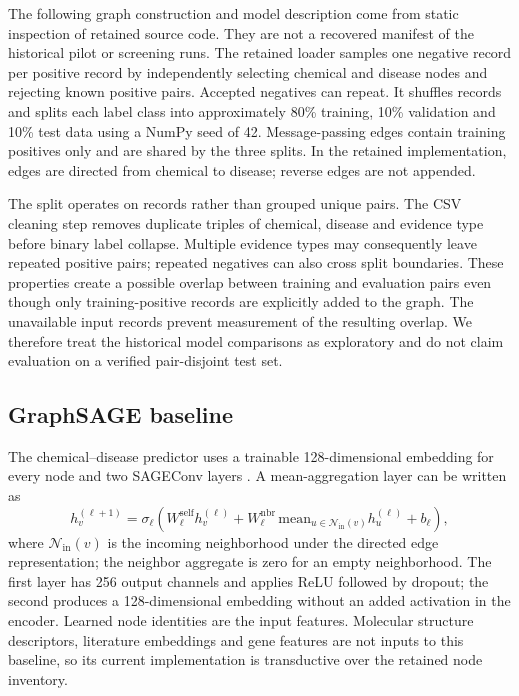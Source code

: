 The following graph construction and model description come from static inspection of retained source code. They are not a recovered manifest of the historical pilot or screening runs. The retained loader samples one negative record per positive record by independently selecting chemical and disease nodes and rejecting known positive pairs. Accepted negatives can repeat. It shuffles records and splits each label class into approximately 80\% training, 10\% validation and 10\% test data using a NumPy seed of 42. Message-passing edges contain training positives only and are shared by the three splits. In the retained implementation, edges are directed from chemical to disease; reverse edges are not appended.

The split operates on records rather than grouped unique pairs. The CSV cleaning step removes duplicate triples of chemical, disease and evidence type before binary label collapse. Multiple evidence types may consequently leave repeated positive pairs; repeated negatives can also cross split boundaries. These properties create a possible overlap between training and evaluation pairs even though only training-positive records are explicitly added to the graph. The unavailable input records prevent measurement of the resulting overlap. We therefore treat the historical model comparisons as exploratory and do not claim evaluation on a verified pair-disjoint test set.

\subsection{GraphSAGE baseline}
The chemical--disease predictor uses a trainable 128-dimensional embedding for every node and two SAGEConv layers \citep{graphsage}. A mean-aggregation layer can be written as
\begin{equation}
 h_v^{(\ell+1)}=\sigma_{\ell}(W_{\ell}^{\mathrm{self}}h_v^{(\ell)}+W_{\ell}^{\mathrm{nbr}}\,\mathrm{mean}_{u\in\mathcal N_{\mathrm{in}}(v)}h_u^{(\ell)}+b_{\ell}),
\end{equation}
where $\mathcal N_{\mathrm{in}}(v)$ is the incoming neighborhood under the directed edge representation; the neighbor aggregate is zero for an empty neighborhood. The first layer has 256 output channels and applies ReLU followed by dropout; the second produces a 128-dimensional embedding without an added activation in the encoder. Learned node identities are the input features. Molecular structure descriptors, literature embeddings and gene features are not inputs to this baseline, so its current implementation is transductive over the retained node inventory.

